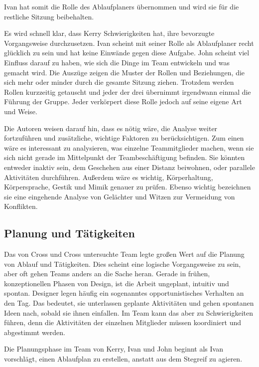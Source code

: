 Ivan hat somit die Rolle des Ablaufplaners übernommen und wird sie für die restliche Sitzung beibehalten.

\medskip Es wird schnell klar, dass Kerry Schwierigkeiten hat, ihre bevorzugte Vorgangsweise durchzusetzen. Ivan scheint mit seiner Rolle als Ablaufplaner recht glücklich zu sein und hat keine Einwände gegen diese Aufgabe. John scheint viel Einfluss darauf zu haben, wie sich die Dinge im Team entwickeln und was gemacht wird. Die Auszüge zeigen die Muster der Rollen und Beziehungen, die sich mehr oder minder durch die gesamte Sitzung ziehen. Trotzdem werden Rollen kurzzeitig getauscht und jeder der drei übernimmt irgendwann einmal die Führung der Gruppe. Jeder verkörpert diese Rolle jedoch auf seine eigene Art und Weise.

Die Autoren weisen darauf hin, dass es nötig wäre, die Analyse weiter fortzuführen und zusätzliche, wichtige Faktoren zu berücksichtigen. Zum einen wäre es interessant zu analysieren, was einzelne Teammitglieder machen, wenn sie sich nicht gerade im Mittelpunkt der Teambeschäftigung befinden. Sie könnten entweder inaktiv sein, dem Geschehen aus einer Distanz beiwohnen, oder parallele Aktivitäten durchführen. Außerdem wäre es wichtig, Körperhaltung, Körpersprache, Gestik und Mimik genauer zu prüfen. Ebenso wichtig bezeichnen sie eine eingehende Analyse von Gelächter und Witzen zur Vermeidung von Konflikten.

\subsection{Planung und Tätigkeiten}\label{sec:collabActions}

Das von Cross und Cross untersuchte Team legte großen Wert auf die Planung von Ablauf und Tätigkeiten. Dies scheint eine logische Vorgangsweise zu sein, aber oft gehen Teams anders an die Sache heran. Gerade in frühen, konzeptionellen Phasen von Design, ist die Arbeit ungeplant, intuitiv und spontan. Designer legen häufig ein sogenanntes opportunistisches Verhalten an den Tag. Das bedeutet, sie unterlassen geplante Aktivitäten und gehen spontanen Ideen nach, sobald sie ihnen einfallen. Im Team kann das aber zu Schwierigkeiten führen, denn die Aktivitäten der einzelnen Mitglieder müssen koordiniert und abgestimmt werden. 

\medskip Die Planungsphase im Team von Kerry, Ivan und John beginnt als Ivan vorschlägt, einen Ablaufplan zu erstellen, anstatt aus dem Stegreif zu agieren.

